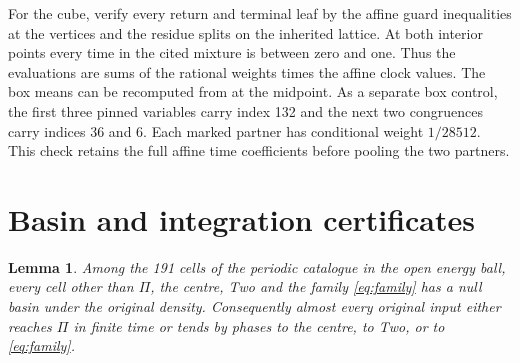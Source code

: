 \documentclass[11pt,reqno]{amsart}
\newtheorem{lemma}[theorem]{Lemma}
\theoremstyle{definition}
\begin{document}
For the cube, verify every return and terminal leaf by the affine
guard inequalities at the vertices and the residue splits on the
inherited lattice. At both interior points every time in the cited
mixture is between zero and one. Thus the evaluations are sums of
the rational weights times the affine clock values. The box means can
be recomputed from \cite[Table~2]{G7} at the midpoint. As a separate
box control, the first three pinned variables carry index 132 and
the next two congruences carry indices 36 and 6. Each marked
partner has conditional weight \(1/28512\). This check retains the
full affine time coefficients before pooling the two partners.

\section{Basin and integration certificates}

\begin{lemma}\label{lem:basins}
Among the 191 cells of the periodic catalogue in the open energy ball,
every cell other than \(\Pi\), the centre, Two and the family
\eqref{eq:family} has a null basin under the original density.
Consequently almost every original input either reaches \(\Pi\) in
finite time or tends by phases to the centre, to Two, or to
\eqref{eq:family}.
\end{lemma}
\end{document}
